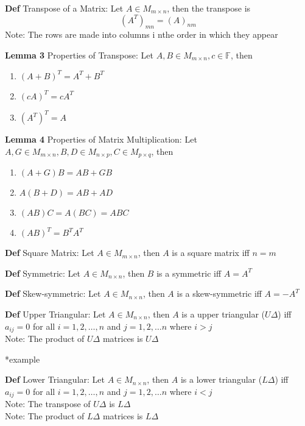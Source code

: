 \documentclass[11pt,notitlepage]{report}
\newcommand{\bb}[1]{\ensuremath{\mathbb{#1}}}
\begin{document}
\textbf{Def} Transpose of a Matrix: Let $A \in M_{m \times n}$, then the transpose is
$$(A^T)_{mn} = (A)_{nm}$$
\hspace*{5mm} Note: The rows are made into columns i nthe order in which they appear

\textbf{Lemma 3} Properties of Transpose: Let $A, B \in M_{m \times n}, c \in \bb F$, then
\begin{enumerate}[label=(\roman*)]
    \item $(A+B)^T = A^T+B^T$
    \item $(cA)^T=cA^T$
    \item $(A^T)^T = A$
\end{enumerate}

\textbf{Lemma 4} Properties of Matrix Multiplication: Let $A, G \in M_{m \times n}, B, D \in M_{n \times p}, C \in M_{p \times q}$, then
\begin{enumerate}[label=(\roman*)]
    \item $(A+G)B = AB + GB$
    \item $A(B+D) = AB + AD$
    \item $(AB)C = A(BC) = ABC$
    \item $(AB)^T = B^TA^T$
\end{enumerate}

\textbf{Def} Square Matrix: Let $A \in M_{m \times n}$, then $A$ is a square matrix iff $n = m$

\textbf{Def} Symmetric: Let $A \in M_{n \times n}$, then $B$ is a symmetric iff $A = A^T$

\textbf{Def} Skew-symmetric: Let $A \in M_{n \times n}$, then $A$ is a skew-symmetric iff $A = -A^T$

\textbf{Def} Upper Triangular: Let $A \in M_{n \times n}$, then $A$ is a upper triangular ($U\Delta$) iff $a_{ij} = 0$ for all $i = 1, 2, \dots, n$ and $j = 1, 2, \dots n$ where $i > j$\\
\hspace*{5mm} Note: The product of $U\Delta$ matrices is $U\Delta$

*example

\textbf{Def} Lower Triangular: Let $A \in M_{n \times n}$, then $A$ is a lower triangular ($L\Delta$) iff $a_{ij} = 0$ for all $i = 1, 2, \dots, n$ and $j = 1, 2, \dots n$ where $i < j$\\
\hspace*{5mm} Note: The transpose of $U\Delta$ is $L\Delta$\\
\hspace*{5mm} Note: The product of $L\Delta$ matrices is $L\Delta$
\end{document}
